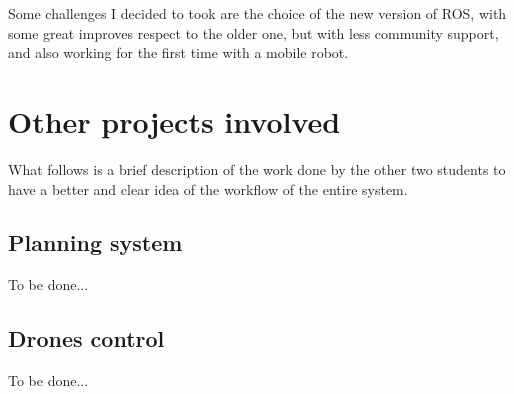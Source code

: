 Some challenges I decided to took are the choice of the new version of ROS, with some great improves respect to the older one, but with less community support, and also working for the first time with a mobile robot.



\section{Other projects involved}

What follows is a brief description of the work done by the other two students to have a better and clear idea of the workflow of the entire system.

\subsection{Planning system}

To be done...

\subsection{Drones control}

To be done...
